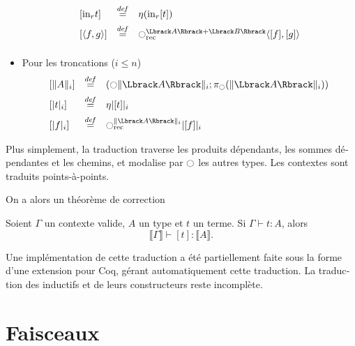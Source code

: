 \begin{otherlanguage}{french}
\begin{itemize}
\[\begin{array}{lcl}
\left[  \mathrm{in}_r t \right] &\defeq& \eta (\mathrm{in}_r [t]) \\[0.5em]
\left[ \langle f ,g\rangle\right] &\defeq& \modal_{\mathrm{rec}}^{\Lbrack A\Rbrack +
                                      \Lbrack B\Rbrack} \langle
                                      [f],[g]\rangle\\[0.5em]
\end{array}
\]
\item Pour les troncations ($i\leqslant n$)
\[
\begin{array}{lcl}
  \left[  \|A\|_i \right] &\defeq& (\modal \| \Lbrack A\Rbrack  \|_i;
                                   \pi_\modal(\| \Lbrack A\Rbrack
                                   \|_i)) \\[0.5em]
  \left[ |t|_i \right] &\defeq& \eta |[t]|_i \\[0.5em]
  \left[ |f|_i \right] &\defeq& \modal_{\mathrm{rec}}^{\| \Lbrack
                                  A\Rbrack  \|_i} | [f] |_i
\end{array}
\]
\end{itemize}

Plus simplement, la traduction traverse les produits dépendants, les
sommes dépendantes et les chemins, et modalise par 
$\ocircle$ les autres types. Les contextes sont traduits
points-à-points.

On a alors un théorème de correction
\begin{prop}
  Soient $\Gamma$ un contexte valide, $A$ un type et $t$ un terme.
  Si $\Gamma \vdash t : A$, alors 
  \[\Lbrack \Gamma \Rbrack \vdash [t] : \Lbrack A \Rbrack. \]
\end{prop}

Une implémentation de cette traduction a été partiellement faite sous
la forme d'une extension pour Coq, gérant automatiquement cette
traduction. La traduction des inductifs et de leurs constructeurs
reste incomplète.

\section{Faisceaux}


\end{otherlanguage}
